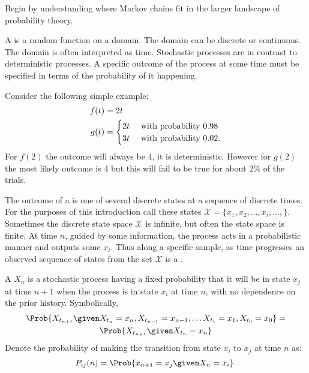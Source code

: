 \documentclass[12pt]{article}
\begin{document}
Begin by understanding where Markov chains fit in the larger landscape
of probability theory.

\begin{definition}
    A  is%
    a random function on a domain.  The domain can be discrete or
    continuous.  The domain is often interpreted as time.  Stochastic processes
    are in contrast to deterministic processes.  A specific outcome of
    the process at some time must be specified in terms of the
    probability of it happening.
\end{definition}

\begin{example}
Consider the following simple example:
\begin{align*}
    f(t) &= 2t \\
    g(t) &=
    \begin{cases}
        2t & \text{ with probability \( 0.98 \) }\\
        3t & \text{ with probability \( 0.02 \)}.
    \end{cases}
\end{align*}
For \( f(2) \) the outcome will always be 4, it is deterministic.
However for \( g(2) \) the most likely outcome is 4 but this will fail
to be true for about \( 2\% \) of the trials.
\end{example}

\begin{definition}
    The outcome of a  is one of several discrete states at a sequence of
  discrete times.%
    For the purposes of this introduction call these states \( \mathcal{X}=\{x_1,x_2,\ldots,x_i,
    \ldots, \} \).  Sometimes the discrete state space \( \mathcal{X} \) is
    infinite, but often the state space is finite.  At time \( n \),
    guided by some information, the process acts in a probabilistic
    manner and outputs some \( x_i \).  Thus along a specific sample, as
    time progresses an observed sequence of states from the set \(
    \mathcal{X} \) is a .
\end{definition}

\begin{definition}
    A  \( X_n \) is a stochastic process having
    a fixed probability that it will be in state \( x_j \) at time \(
    n+1 \) when the process is in state \( x_i \) at time \( n \), with
    no dependence on the prior history.%
    Symbolically,
    \begin{multline*}
        \Prob{X_{t_{n+1}} \given X_{t_{n}} = x_n, X_{t_{n-1}} = x_{n-1},
        \dots X_{t_1} = x_{1}, X_{t_0} = x_{0}} = \\
        \Prob{X_{t_{n+1}} \given X_{t_{n}} = x_{n}}
    \end{multline*}
    Denote the probability of making the transition from state \( x_i \)
    to \( x_j \) at time \( n \) as:
    \[
        P_{ij}(n)=\Prob{x_{n+1}=x_j \given X_n=x_i}.
    \]
\end{definition}
\end{document}

